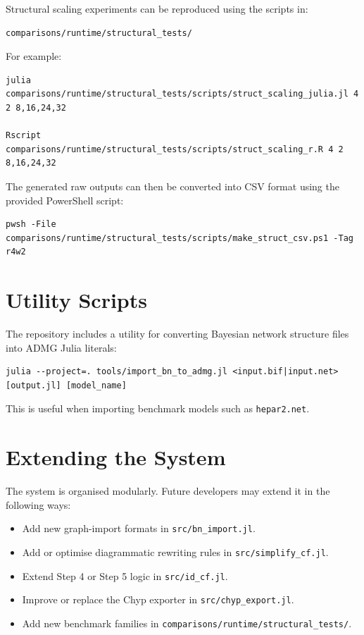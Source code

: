 \documentclass[a4paper]{report}
\begin{document}
Structural scaling experiments can be reproduced using the scripts in:

\begin{verbatim}
comparisons/runtime/structural_tests/
\end{verbatim}

For example:

\begin{verbatim}
julia comparisons/runtime/structural_tests/scripts/struct_scaling_julia.jl 4 2 8,16,24,32

Rscript comparisons/runtime/structural_tests/scripts/struct_scaling_r.R 4 2 8,16,24,32
\end{verbatim}

The generated raw outputs can then be converted into CSV format using the provided PowerShell script:

\begin{verbatim}
pwsh -File comparisons/runtime/structural_tests/scripts/make_struct_csv.ps1 -Tag r4w2
\end{verbatim}

\section{Utility Scripts}

The repository includes a utility for converting Bayesian network structure files into ADMG Julia literals:

\begin{verbatim}
julia --project=. tools/import_bn_to_admg.jl <input.bif|input.net> [output.jl] [model_name]
\end{verbatim}

This is useful when importing benchmark models such as \texttt{hepar2.net}.

\section{Extending the System}

The system is organised modularly. Future developers may extend it in the following ways:

\begin{itemize}
    \item Add new graph-import formats in \texttt{src/bn\_import.jl}.
    \item Add or optimise diagrammatic rewriting rules in \texttt{src/simplify\_cf.jl}.
    \item Extend Step 4 or Step 5 logic in \texttt{src/id\_cf.jl}.
    \item Improve or replace the Chyp exporter in \texttt{src/chyp\_export.jl}.
    \item Add new benchmark families in \texttt{comparisons/runtime/structural\_tests/}.
\end{itemize}
\end{document}
